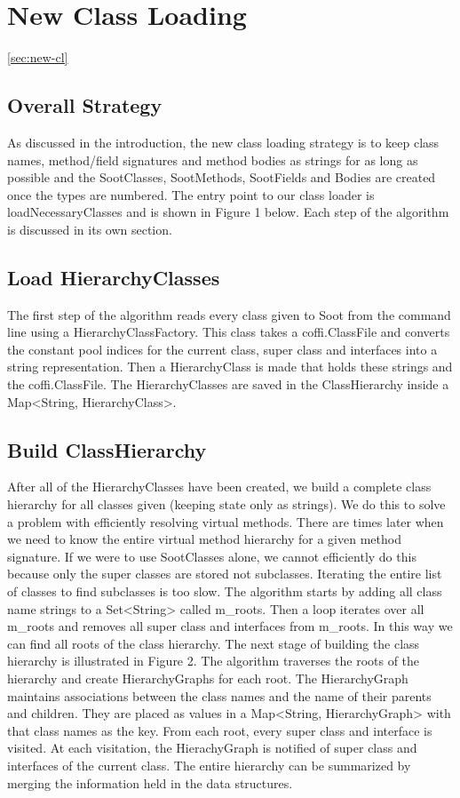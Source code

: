 \documentclass[preprint]{sigplanconf}
\begin{document}
\section{New Class Loading}
\ref{sec:new-cl}
\subsection{Overall Strategy}
As discussed in the introduction, the new class loading strategy is to keep class names, method/field signatures and method bodies as strings for as long as possible and the SootClasses, SootMethods, SootFields and Bodies are created once the types are numbered. The entry point to our class loader is loadNecessaryClasses and is shown in Figure 1 below. Each step of the algorithm is discussed in its own section.

\subsection{Load HierarchyClasses}
The first step of the algorithm reads every class given to Soot from the command line using a HierarchyClassFactory. This class takes a coffi.ClassFile and converts the constant pool indices for the current class, super class and interfaces into a string representation. Then a HierarchyClass is made that holds these strings and the coffi.ClassFile. The HierarchyClasses are saved in the ClassHierarchy inside a Map<String, HierarchyClass>.

\subsection{Build ClassHierarchy}
After all of the HierarchyClasses have been created, we build a complete class hierarchy for all classes given (keeping state only as strings). We do this to solve a problem with efficiently resolving virtual methods. There are times later when we need to know the entire virtual method hierarchy for a given method signature. If we were to use SootClasses alone, we cannot efficiently do this because only the super classes are stored not subclasses. Iterating the entire list of classes to find subclasses is too slow.
The algorithm starts by adding all class name strings to a Set<String> called m\_roots. Then a loop iterates over all m\_roots and removes all super class and interfaces from m\_roots. In this way we can find all roots of the class hierarchy.
The next stage of building the class hierarchy is illustrated in Figure 2. The algorithm traverses the roots of the hierarchy and create HierarchyGraphs for each root. The HierarchyGraph maintains associations between the class names and the name of their parents and children. They are placed as values in a Map<String, HierarchyGraph> with that class names as the key. From each root, every super class and interface is visited. At each visitation, the HierachyGraph is notified of super class and interfaces of the current class. The entire hierarchy can be summarized by merging the information held in the data structures.
\end{document}
